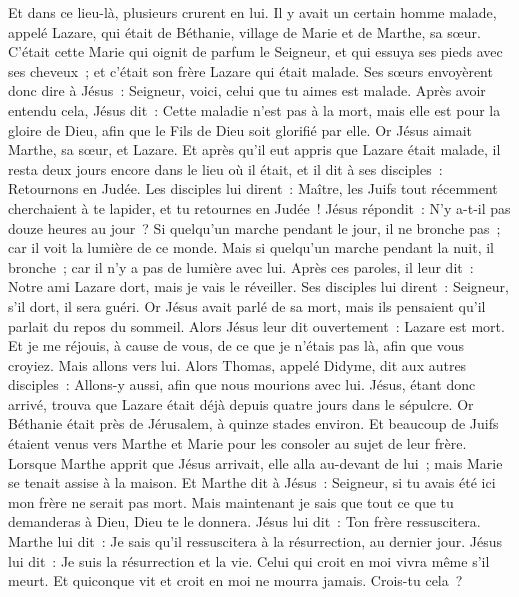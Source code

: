 \begin{multicols}{2}
Et dans ce lieu-là, plusieurs crurent en lui.
\VerseOne{}Il y avait un certain homme malade, appelé Lazare, qui était de Béthanie, village de Marie et de Marthe, sa sœur.
C'était cette Marie qui oignit de parfum le Seigneur, et qui essuya ses pieds avec ses cheveux~; et c'était son frère Lazare qui était malade.
Ses sœurs envoyèrent donc dire à Jésus~: Seigneur, voici, celui que tu aimes est malade.
Après avoir entendu cela, Jésus dit~: Cette maladie n'est pas à la mort, mais elle est pour la gloire de Dieu, afin que le Fils de Dieu soit glorifié par elle.
Or Jésus aimait Marthe, sa sœur, et Lazare.
Et après qu'il eut appris que Lazare était malade, il resta deux jours encore dans le lieu où il était,
et il dit à ses disciples~: Retournons en Judée.
Les disciples lui dirent~: Maître, les Juifs tout récemment cherchaient à te lapider, et tu retournes en Judée~!
Jésus répondit~: N'y a-t-il pas douze heures au jour~? Si quelqu'un marche pendant le jour, il ne bronche pas~; car il voit la lumière de ce monde.
Mais si quelqu'un marche pendant la nuit, il bronche~; car il n'y a pas de lumière avec lui.
Après ces paroles, il leur dit~: Notre ami Lazare dort, mais je vais le réveiller.
Ses disciples lui dirent~: Seigneur, s'il dort, il sera guéri.
Or Jésus avait parlé de sa mort, mais ils pensaient qu'il parlait du repos du sommeil.
Alors Jésus leur dit ouvertement~: Lazare est mort.
Et je me réjouis, à cause de vous, de ce que je n'étais pas là, afin que vous croyiez. Mais allons vers lui.
Alors Thomas, appelé Didyme, dit aux autres disciples~: Allons-y aussi, afin que nous mourions avec lui.
Jésus, étant donc arrivé, trouva que Lazare était déjà depuis quatre jours dans le sépulcre.
Or Béthanie était près de Jérusalem, à quinze stades environ.
Et beaucoup de Juifs étaient venus vers Marthe et Marie pour les consoler au sujet de leur frère.
Lorsque Marthe apprit que Jésus arrivait, elle alla au-devant de lui~; mais Marie se tenait assise à la maison.
Et Marthe dit à Jésus~: Seigneur, si tu avais été ici mon frère ne serait pas mort.
Mais maintenant je sais que tout ce que tu demanderas à Dieu, Dieu te le donnera.
Jésus lui dit~: Ton frère ressuscitera.
Marthe lui dit~: Je sais qu'il ressuscitera à la résurrection, au dernier jour.
Jésus lui dit~: Je suis la résurrection et la vie. Celui qui croit en moi vivra même s'il meurt.
Et quiconque vit et croit en moi ne mourra jamais. Crois-tu cela~?

\end{multicols}
